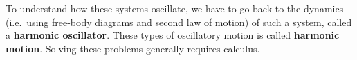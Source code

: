 To understand how these systems oscillate, we have to go back to the dynamics
(i.e.\ using free-body diagrams and second law of motion) of such a system,
called a \textbf{harmonic oscillator}. These types of oscillatory motion is
called \textbf{harmonic motion}. Solving these problems generally requires
calculus.


